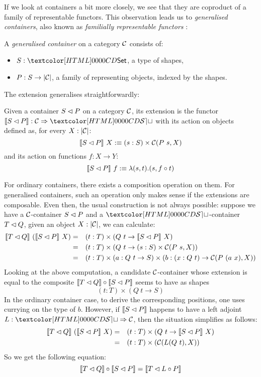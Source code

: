 If we look at containers a bit more closely, we see that they are
coproduct of a family of representable functors. This observation
leads us to \emph{generalised containers}, also known as
\emph{familially representable functors} \cite{Carboni1995}:
%
\begin{definition}
\label{def-gen-container}
  A \emph{generalised container} on a category $\mathcal{C}$ consists of:
  \begin{itemize}
  \item $S : \Set$, a type of shapes,
  \item $P : S \to | \mathcal{C} |$, a family of representing objects, indexed
    by the shapes.
  \end{itemize}
\end{definition}
%
The extension generalises straightforwardly:
%
\begin{definition}
  Given a container $S \lhd P$ on a category $\mathcal{C}$, its extension
  is the functor $\context{\cont{S}{P}} : \Func{\Cc}{\SET}$ with its
  action on objects defined as, for every $X : | \mathcal{C} |$:
  $$
  \llbracket S \lhd P \rrbracket\ X :\equiv (s : S) \times \mathcal{C}(P\ s, X)
  $$
  and its action on functions $f : X \to Y$:
  $$
  \llbracket S \lhd P \rrbracket\ f :\equiv \lambda (s , t) . (s , f \circ t)
  $$
\end{definition}
%
For ordinary containers, there exists a composition operation on
them. For generalised containers, such an operation only makes sense
if the extensions are composable. Even then, the usual construction is
not always possible: suppose we have a $\mathcal{C}$-container $S \lhd P$
and a $\SET$-container $T \lhd Q$, given an object $X : | \mathcal{C} |$, we can calculate:
\begin{align*}
  \context{\cont{T}{Q}}\ (\context{\cont{S}{P}}\ X) &=& &(t : T) \times (Q\ t \to \context{\cont{S}{P}}\ X) \\
  &=& &(t : T) \times (Q\ t \to (s : S) \times \Cc(P\ s, X)) \\
  &=& &(t : T) \times (a : Q\ t \to S) \times (b : (x : Q\ t) \to \Cc(P\ (a\ x), X))
\end{align*}
Looking at the above computation, a candidate $\mathcal{C}$-container whose
extension is equal to the composite
$\llbracket T \lhd Q \rrbracket \circ \llbracket S \lhd P \rrbracket$ seems to have as shapes
$$
(t : T) \times (Q\ t \to S)
$$
In the ordinary container case, to derive the corresponding positions,
one uses currying on the type of $b$. However, if
$\llbracket S \lhd P \rrbracket$ happens to have a left adjoint
$L : \Func{\SET}{\Cc}$, then the situation simplifies as follows:
\begin{align*}
  \llbracket T \lhd Q \rrbracket\ (\llbracket S \lhd P \rrbracket\ X) &=& &(t : T) \times (Q\ t \to \llbracket S \lhd P \rrbracket\ X) \\
  &=& &(t : T) \times (\mathcal{C}(L (Q\ t), X)) \\
\end{align*}
So we get the following equation:
$$
\llbracket T \lhd Q \rrbracket \circ \llbracket S \lhd P \rrbracket = \llbracket T \lhd L \circ P \rrbracket
$$

